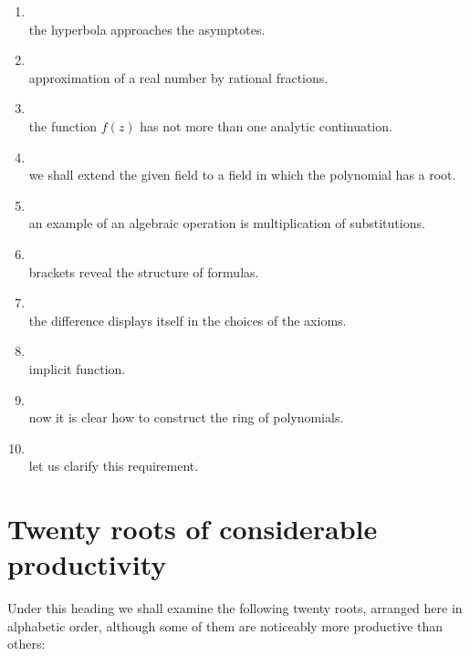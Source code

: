 \begin{enumerate}[label=\arabic*)]
\item {}\\
      the hyperbola approaches the asymptotes.
\item {}\\
      approximation of a real number by rational fractions.
\item {}\\
      the function $f(z)$ has not more than one analytic continuation.
\item {}\\
      we shall extend the given field to a field in which the polynomial has a root.
\item {}\\
      an example of an algebraic operation is multiplication of substitutions.
\item {}\\
      brackets reveal the structure of formulas.
\item {}\\
      the difference displays itself in the choices of the axioms.
\item {}\\
      implicit function.
\item {}\\
      now it is clear how to construct the ring of polynomials.
\item {}\\
      let us clarify this requirement.
\end{enumerate}


\section{Twenty roots of considerable productivity}

Under this heading we shall examine the following twenty roots, arranged here in alphabetic order, although some of them are noticeably more productive than others:

